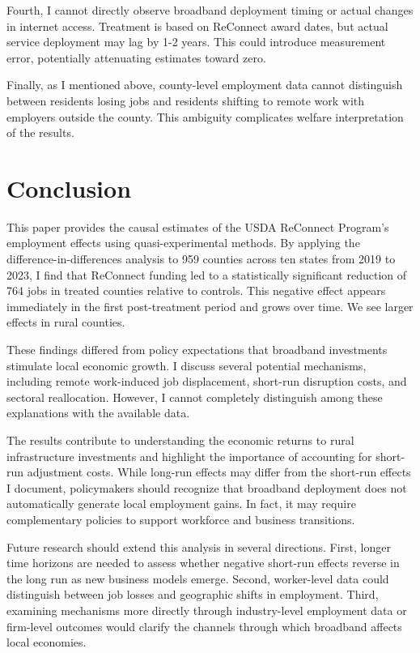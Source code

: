 \documentclass[12pt]{article}
\begin{document}
Fourth, I cannot directly observe broadband deployment timing or actual changes in internet access. Treatment is based on ReConnect award dates, but actual service deployment may lag by 1-2 years. This could introduce measurement error, potentially attenuating estimates toward zero.

Finally, as I mentioned above, county-level employment data cannot distinguish between residents losing jobs and residents shifting to remote work with employers outside the county. This ambiguity complicates welfare interpretation of the results.

\section{Conclusion}

This paper provides the causal estimates of the USDA ReConnect Program’s employment effects using quasi-experimental methods. By applying the difference-in-differences analysis to 959 counties across ten states from 2019 to 2023, I find that ReConnect funding led to a statistically significant reduction of 764 jobs in treated counties relative to controls. This negative effect appears immediately in the first post-treatment period and grows over time. We see larger effects in rural counties.

These findings differed from policy expectations that broadband investments stimulate local economic growth. I discuss several potential mechanisms, including remote work-induced job displacement, short-run disruption costs, and sectoral reallocation. However, I cannot completely distinguish among these explanations with the available data.

The results contribute to understanding the economic returns to rural infrastructure investments and highlight the importance of accounting for short-run adjustment costs. While long-run effects may differ from the short-run effects I document, policymakers should recognize that broadband deployment does not automatically generate local employment gains. In fact, it may require complementary policies to support workforce and business transitions.

Future research should extend this analysis in several directions. First, longer time horizons are needed to assess whether negative short-run effects reverse in the long run as new business models emerge. Second, worker-level data could distinguish between job losses and geographic shifts in employment. Third, examining mechanisms more directly through industry-level employment data or firm-level outcomes would clarify the channels through which broadband affects local economies.
\end{document}
